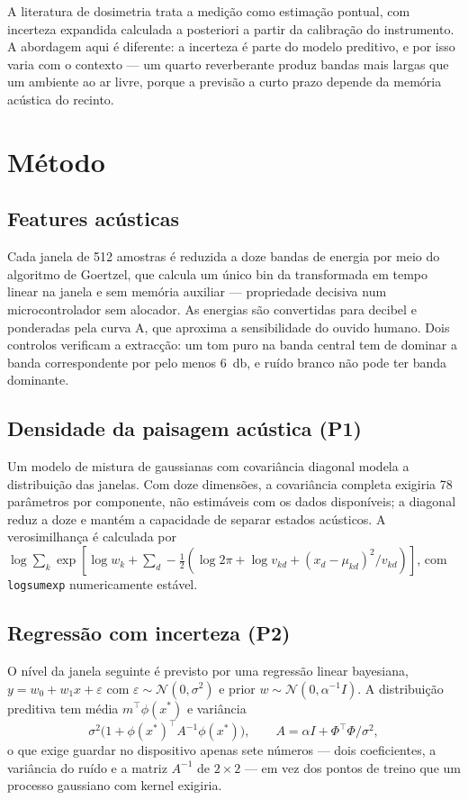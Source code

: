 \documentclass[10pt,a4paper]{article}
\begin{document}
A literatura de dosimetria trata a medição como estimação pontual, com incerteza expandida
calculada a posteriori a partir da calibração do instrumento. A abordagem aqui é diferente:
a incerteza é parte do modelo preditivo, e por isso varia com o contexto --- um quarto
reverberante produz bandas mais largas que um ambiente ao ar livre, porque a previsão a
curto prazo depende da memória acústica do recinto.

\section{Método}

\subsection{Features acústicas}

Cada janela de \num{512} amostras é reduzida a doze bandas de energia por meio do algoritmo
de Goertzel, que calcula um único bin da transformada em tempo linear na janela e sem
memória auxiliar --- propriedade decisiva num microcontrolador sem alocador. As energias são
convertidas para decibel e ponderadas pela curva A, que aproxima a sensibilidade do ouvido
humano. Dois controlos verificam a extracção: um tom puro na banda central tem de dominar a
banda correspondente por pelo menos \SI{6}{\decibel}, e ruído branco não pode ter banda
dominante.

\subsection{Densidade da paisagem acústica (P1)}

Um modelo de mistura de gaussianas com covariância diagonal modela a distribuição das
janelas. Com doze dimensões, a covariância completa exigiria \num{78} parâmetros por
componente, não estimáveis com os dados disponíveis; a diagonal reduz a doze e mantém a
capacidade de separar estados acústicos. A verosimilhança é calculada por
$\log\sum_k \exp[\log w_k + \sum_d -\tfrac{1}{2}(\log 2\pi + \log v_{kd} +
(x_d-\mu_{kd})^2/v_{kd})]$, com \texttt{logsumexp} numericamente estável.

\subsection{Regressão com incerteza (P2)}

O nível da janela seguinte é previsto por uma regressão linear bayesiana,
$y = w_0 + w_1 x + \varepsilon$ com $\varepsilon\sim\mathcal{N}(0,\sigma^2)$ e prior
$w\sim\mathcal{N}(0,\alpha^{-1}I)$. A distribuição preditiva tem média $m^\top\phi(x^*)$ e
variância
\begin{equation}
  \sigma^2\bigl(1 + \phi(x^*)^\top A^{-1}\phi(x^*)\bigr), \qquad A = \alpha I + \Phi^\top\Phi/\sigma^2,
\end{equation}
o que exige guardar no dispositivo apenas sete números --- dois coeficientes, a variância do
ruído e a matriz $A^{-1}$ de $2\times2$ --- em vez dos pontos de treino que um processo
gaussiano com kernel exigiria.
\end{document}

